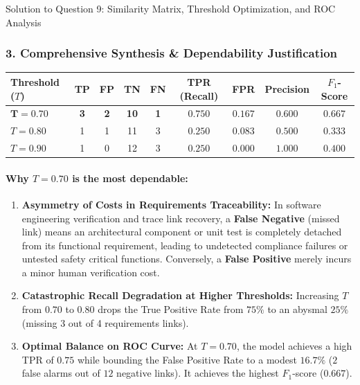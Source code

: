 \documentclass[11pt,a4paper]{article}
\begin{document}
\begin{solutionbox}{Solution to Question 9: Similarity Matrix, Threshold Optimization, and ROC Analysis}
\subsubsection*{3. Comprehensive Synthesis \& Dependability Justification}
\begin{center}
\small
\begin{tabular}{lcccccccc}
\toprule
\textbf{Threshold ($T$)} & \textbf{TP} & \textbf{FP} & \textbf{TN} & \textbf{FN} & \textbf{TPR (Recall)} & \textbf{FPR} & \textbf{Precision} & \textbf{$F_1$-Score} \\
\midrule
$\mathbf{T = 0.70}$ & \textbf{3} & \textbf{2} & \textbf{10} & \textbf{1} & $\mathbf{0.750}$ & $\mathbf{0.167}$ & $\mathbf{0.600}$ & $\mathbf{0.667}$ \\
$T = 0.80$          & 1          & 1          & 11          & 3          & $0.250$          & $0.083$          & $0.500$          & $0.333$ \\
$T = 0.90$          & 1          & 0          & 12          & 3          & $0.250$          & $0.000$          & $1.000$          & $0.400$ \\
\bottomrule
\end{tabular}
\end{center}

\paragraph{Why $T = 0.70$ is the most dependable:}
\begin{enumerate}
    \item \textbf{Asymmetry of Costs in Requirements Traceability:} In software engineering verification and trace link recovery, a \textbf{False Negative} (missed link) means an architectural component or unit test is completely detached from its functional requirement, leading to undetected compliance failures or untested safety critical functions. Conversely, a \textbf{False Positive} merely incurs a minor human verification cost.
    \item \textbf{Catastrophic Recall Degradation at Higher Thresholds:} Increasing $T$ from $0.70$ to $0.80$ drops the True Positive Rate from $75\%$ to an abysmal $25\%$ (missing 3 out of 4 requirements links).
    \item \textbf{Optimal Balance on ROC Curve:} At $T = 0.70$, the model achieves a high TPR of $0.75$ while bounding the False Positive Rate to a modest $16.7\%$ ($2$ false alarms out of $12$ negative links). It achieves the highest $F_1$-score ($0.667$).
\end{enumerate}


\end{solutionbox}
\end{document}

